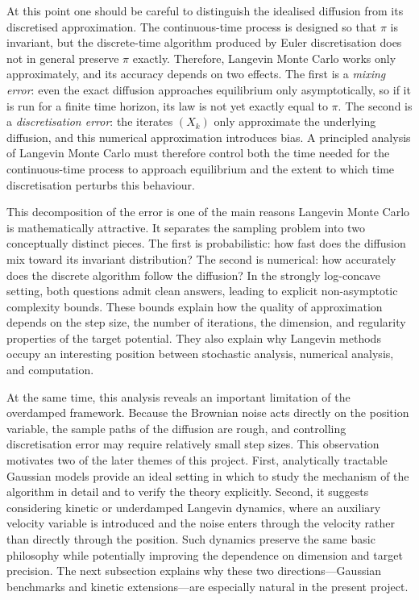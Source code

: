 \documentclass[a4paper,11pt, titlepage]{article}
\theoremstyle{definition}
\theoremstyle{plain}
\theoremstyle{remark}
\begin{document}
At this point one should be careful to distinguish the idealised diffusion from its discretised approximation. The continuous-time process is designed so that $\pi$ is invariant, but the discrete-time algorithm produced by Euler discretisation does not in general preserve $\pi$ exactly. Therefore, Langevin Monte Carlo works only approximately, and its accuracy depends on two effects. The first is a \emph{mixing error}: even the exact diffusion approaches equilibrium only asymptotically, so if it is run for a finite time horizon, its law is not yet exactly equal to $\pi$. The second is a \emph{discretisation error}: the iterates $(X_k)$ only approximate the underlying diffusion, and this numerical approximation introduces bias. A principled analysis of Langevin Monte Carlo must therefore control both the time needed for the continuous-time process to approach equilibrium and the extent to which time discretisation perturbs this behaviour.

This decomposition of the error is one of the main reasons Langevin Monte Carlo is mathematically attractive. It separates the sampling problem into two conceptually distinct pieces. The first is probabilistic: how fast does the diffusion mix toward its invariant distribution? The second is numerical: how accurately does the discrete algorithm follow the diffusion? In the strongly log-concave setting, both questions admit clean answers, leading to explicit non-asymptotic complexity bounds. These bounds explain how the quality of approximation depends on the step size, the number of iterations, the dimension, and regularity properties of the target potential. They also explain why Langevin methods occupy an interesting position between stochastic analysis, numerical analysis, and computation.

At the same time, this analysis reveals an important limitation of the overdamped framework. Because the Brownian noise acts directly on the position variable, the sample paths of the diffusion are rough, and controlling discretisation error may require relatively small step sizes. This observation motivates two of the later themes of this project. First, analytically tractable Gaussian models provide an ideal setting in which to study the mechanism of the algorithm in detail and to verify the theory explicitly. Second, it suggests considering kinetic or underdamped Langevin dynamics, where an auxiliary velocity variable is introduced and the noise enters through the velocity rather than directly through the position. Such dynamics preserve the same basic philosophy while potentially improving the dependence on dimension and target precision. The next subsection explains why these two directions---Gaussian benchmarks and kinetic extensions---are especially natural in the present project.
\end{document}

